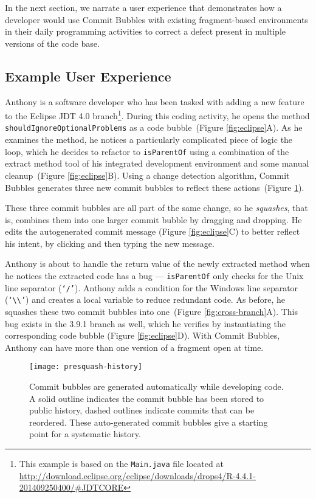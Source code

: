 \documentclass[conference]{IEEEtran}
\begin{document}
In the next section, we narrate a user experience that demonstrates how a developer would use Commit Bubbles with existing fragment-based environments in their daily programming activities to correct a defect present in multiple versions of the code base. 

\subsection*{Example User Experience}
\label{sec:userexperience}

Anthony is a software developer who has been tasked with adding a new feature to the Eclipse JDT 4.0 branch\footnote{This example is based on the \texttt{Main.java} file located at \url{http://download.eclipse.org/eclipse/downloads/drops4/R-4.4.1-201409250400/#JDTCORE}}.
During this coding activity, he opens the method \texttt{shouldIgnoreOptionalProblems} as a code bubble~(Figure \ref{fig:eclipse}A).
As he examines the method, he notices a particularly complicated piece of logic the loop, which he decides to refactor to \texttt{isParentOf} using a combination of the extract method tool of his integrated development environment and some manual cleanup~(Figure \ref{fig:eclipse}B).
Using a change detection algorithm, Commit Bubbles generates three new commit bubbles to reflect these actions~(Figure \ref{fig:presquash-history}).

These three commit bubbles are all part of the same change, so he \textit{squashes}, that is, combines them into one larger commit bubble by dragging and dropping.
He edits the autogenerated commit message (Figure \ref{fig:eclipse}C) to better reflect his intent, by clicking and then typing the new message.

Anthony is about to handle the return value of the newly extracted method when he notices the extracted code has a bug --- \texttt{isParentOf} only checks for the Unix line separator (\texttt{`/'}).
Anthony adds a condition for the Windows line separator (\texttt{`\textbackslash\textbackslash'}) and creates a local variable to reduce redundant code.
As before, he squashes these two commit bubbles into one~(Figure \ref{fig:cross-branch}A).
This bug exists in the 3.9.1 branch as well, which he verifies by instantiating the corresponding code bubble (Figure \ref{fig:eclipse}D).
With Commit Bubbles, Anthony can have more than one version of a fragment open at time.


\begin{figure}
\centering
\texttt{[image: presquash-history]}
\caption{Commit bubbles are generated automatically while developing code. 
A solid outline indicates the commit bubble has been stored to public history, dashed outlines indicate commits that can be reordered.
These auto-generated commit bubbles give a starting point for a systematic history.}
\label{fig:presquash-history}
\end{figure}
\end{document}
